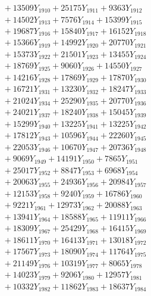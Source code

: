 \documentclass[a4paper,10pt]{article}
\begin{document}
{\begin{align}
&\;  + 13509 Y_{1910} + 25175 Y_{1911} + 9363 Y_{1912} \\[0.3ex]
&\;  + 14502 Y_{1913} + 7576 Y_{1914} + 15399 Y_{1915} \\[0.3ex]
&\;  + 19687 Y_{1916} + 15840 Y_{1917} + 16152 Y_{1918} \\[0.5ex]\allowbreak
&\;  + 15366 Y_{1919} + 14992 Y_{1920} + 20770 Y_{1921} \\[0.3ex]
&\;  + 15373 Y_{1922} + 21501 Y_{1923} + 13455 Y_{1924} \\[0.3ex]
&\;  + 18769 Y_{1925} + 9060 Y_{1926} + 14550 Y_{1927} \\[0.3ex]
&\;  + 14216 Y_{1928} + 17869 Y_{1929} + 17870 Y_{1930} \\[0.3ex]
&\;  + 16721 Y_{1931} + 13230 Y_{1932} + 18247 Y_{1933} \\[0.3ex]
&\;  + 21024 Y_{1934} + 25290 Y_{1935} + 20770 Y_{1936} \\[0.3ex]
&\;  + 24021 Y_{1937} + 18240 Y_{1938} + 15045 Y_{1939} \\[0.3ex]
&\;  + 15299 Y_{1940} + 13225 Y_{1941} + 13225 Y_{1942} \\[0.3ex]
&\;  + 17812 Y_{1943} + 10596 Y_{1944} + 22260 Y_{1945} \\[0.3ex]
&\;  + 22053 Y_{1946} + 10670 Y_{1947} + 20736 Y_{1948} \\[0.5ex]\allowbreak
&\;  + 9069 Y_{1949} + 14191 Y_{1950} + 7865 Y_{1951} \\[0.3ex]
&\;  + 25017 Y_{1952} + 8847 Y_{1953} + 6968 Y_{1954} \\[0.3ex]
&\;  + 20063 Y_{1955} + 24936 Y_{1956} + 20984 Y_{1957} \\[0.3ex]
&\;  + 12153 Y_{1958} + 9240 Y_{1959} + 16786 Y_{1960} \\[0.3ex]
&\;  + 9221 Y_{1961} + 12973 Y_{1962} + 20088 Y_{1963} \\[0.3ex]
&\;  + 13941 Y_{1964} + 18588 Y_{1965} + 11911 Y_{1966} \\[0.3ex]
&\;  + 18309 Y_{1967} + 25429 Y_{1968} + 16415 Y_{1969} \\[0.3ex]
&\;  + 18611 Y_{1970} + 16413 Y_{1971} + 13018 Y_{1972} \\[0.3ex]
&\;  + 17567 Y_{1973} + 18090 Y_{1974} + 11764 Y_{1975} \\[0.3ex]
&\;  + 21149 Y_{1976} + 10319 Y_{1977} + 8065 Y_{1978} \\[0.5ex]\allowbreak
&\;  + 14023 Y_{1979} + 9206 Y_{1980} + 12957 Y_{1981} \\[0.3ex]
&\;  + 10332 Y_{1982} + 11862 Y_{1983} + 18637 Y_{1984} \\[0.3ex]

\end{align}}
\end{document}
